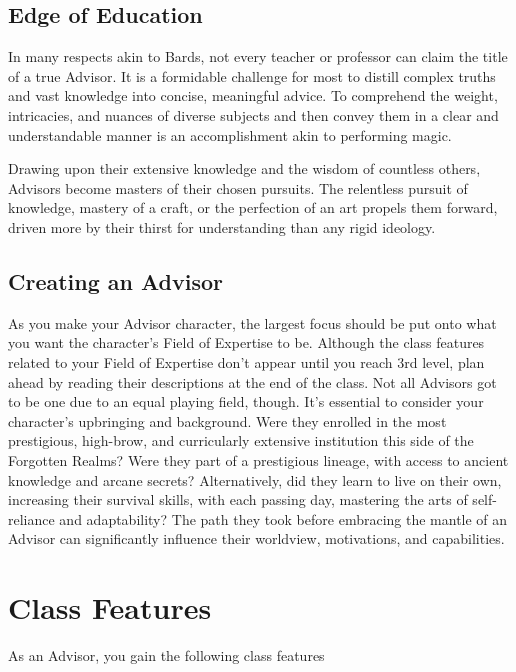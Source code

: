 \documentclass[letterpaper,openany,twoside,twocolumn]{book}
\begin{document}
	\subsection{Edge of Education}
	In many respects akin to Bards, not every teacher or professor can claim the title of a true Advisor. It is a formidable challenge for most to distill complex truths and vast knowledge into concise, meaningful advice. To comprehend the weight, intricacies, and nuances of diverse subjects and then convey them in a clear and understandable manner is an accomplishment akin to performing magic.

	Drawing upon their extensive knowledge and the wisdom of countless others, Advisors become masters of their chosen pursuits. The relentless pursuit of knowledge, mastery of a craft, or the perfection of an art propels them forward, driven more by their thirst for understanding than any rigid ideology.
	\vfill\eject
	\vspace*{20cm}
	\subsection{Creating an Advisor}
	As you make your Advisor character, the largest focus should be put onto what you want the character's Field of Expertise to be. Although the class features related to your Field of Expertise don't appear until you reach 3rd level, plan ahead by reading their descriptions at the end of the class.
	\clearpage
	\noindent Not all Advisors got to be one due to an equal playing field, though. It's essential to consider your character's upbringing and background. Were they enrolled in the most prestigious, high-brow, and curricularly extensive institution this side of the Forgotten Realms? Were they part of a prestigious lineage, with access to ancient knowledge and arcane secrets? Alternatively, did they learn to live on their own, increasing their survival skills, with each passing day, mastering the arts of self-reliance and adaptability? The path they took before embracing the mantle of an Advisor can significantly influence their worldview, motivations, and capabilities.
	
	
	
	\section*{Class Features}
	As an Advisor, you gain the following class features
	
\end{document}
